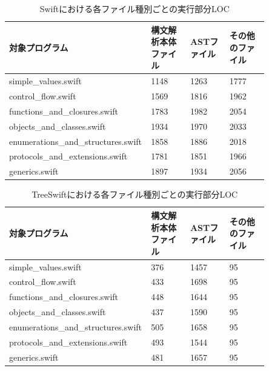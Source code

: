 \begin{table}[!hbtp]
    \begin{center}
        \caption{Swiftにおける各ファイル種別ごとの実行部分LOC}
        \begin{tabular}{|p{0.4\linewidth}|p{0.15\linewidth}|p{0.15\linewidth}|p{0.15\linewidth}|}
            \hline
            対象プログラム & 構文解析本体ファイル & ASTファイル & その他のファイル\\
            \hline
            \hline
            simple\_values.swift & 1148 & 1263 & 1777\\
            \hline
            control\_flow.swift & 1569 & 1816 & 1962\\
            \hline
            functions\_and\_closures.swift & 1783 & 1982 & 2054\\
            \hline
            objects\_and\_classes.swift & 1934 & 1970 & 2033\\
            \hline
            enumerations\_and\_structures.swift & 1858 & 1886 & 2018\\
            \hline
            protocols\_and\_extensions.swift & 1781 & 1851 & 1966\\
            \hline
            generics.swift & 1897 & 1934 & 2056\\
            \hline
        \end{tabular}
        \label{table:loc-swift-per-file}
    \end{center}
\end{table}

\begin{table}[!hbtp]
    \begin{center}
        \caption{TreeSwiftにおける各ファイル種別ごとの実行部分LOC}
        \begin{tabular}{|p{0.4\linewidth}|p{0.15\linewidth}|p{0.15\linewidth}|p{0.15\linewidth}|}
            \hline
            対象プログラム & 構文解析本体ファイル & ASTファイル & その他のファイル\\
            \hline
            \hline
            simple\_values.swift & 376 & 1457 & 95\\
            \hline
            control\_flow.swift & 433 & 1698 & 95\\
            \hline
            functions\_and\_closures.swift & 448 & 1644 & 95\\
            \hline
            objects\_and\_classes.swift & 437 & 1590 & 95\\
            \hline
            enumerations\_and\_structures.swift & 505 & 1658 & 95\\
            \hline
            protocols\_and\_extensions.swift & 493 & 1544 & 95\\
            \hline
            generics.swift & 481 & 1657 & 95\\
            \hline
        \end{tabular}
        \label{table:loc-treeswift-per-file}
    \end{center}
\end{table}

